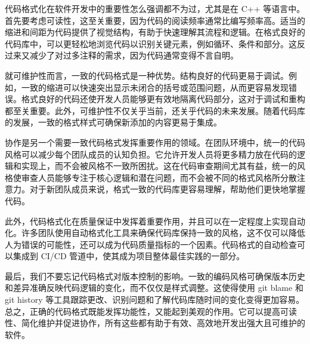代码格式化在软件开发中的重要性怎么强调都不为过，尤其是在 C++ 等语言中。首先要考虑可读性，这至关重要，因为代码的阅读频率通常比编写频率高。适当的缩进和间距为代码提供了视觉结构，有助于快速理解其流程和逻辑。在格式良好的代码库中，可以更轻松地浏览代码以识别关键元素，例如循环、条件和部分。这反过来又减少了对过多注释的需求，因为代码通常变得不言自明。

就可维护性而言，一致的代码格式是一种优势。结构良好的代码更易于调试。例如，一致的缩进可以快速突出显示未闭合的括号或范围问题，从而更容易发现错误。格式良好的代码还使开发人员能够更有效地隔离代码部分，这对于调试和重构都至关重要。此外，可维护性不仅关乎当前，还关乎代码的未来发展。随着代码库的发展，一致的格式样式可确保新添加的内容更易于集成。

协作是另一个需要一致代码格式发挥重要作用的领域。在团队环境中，统一的代码风格可以减少每个团队成员的认知负担。它允许开发人员将更多精力放在代码的逻辑和实现上，而不会被风格不一致所困扰。这在代码审查期间尤其有益，统一的风格使审查人员能够专注于核心逻辑和潜在问题，而不会被不同的格式风格所分散注意力。对于新团队成员来说，格式一致的代码库更容易理解，帮助他们更快地掌握代码。

此外，代码格式化在质量保证中发挥着重要作用，并且可以在一定程度上实现自动化。许多团队使用自动格式化工具来确保代码库保持一致的风格，这不仅可以降低人为错误的可能性，还可以成为代码质量指标的一个因素。代码格式的自动检查可以集成到 CI/CD 管道中，使其成为项目整体最佳实践的一部分。

最后，我们不要忘记代码格式对版本控制的影响。一致的编码风格可确保版本历史和差异准确反映代码逻辑的变化，而不仅仅是样式调整。这使得使用 git blame 和 git history 等工具跟踪更改、识别问题和了解代码库随时间的变化变得更加容易。
总之，正确的代码格式既能发挥功能性，又能起到美观的作用。它可以提高可读性、简化维护并促进协作，所有这些都有助于有效、高效地开发出强大且可维护的软件。